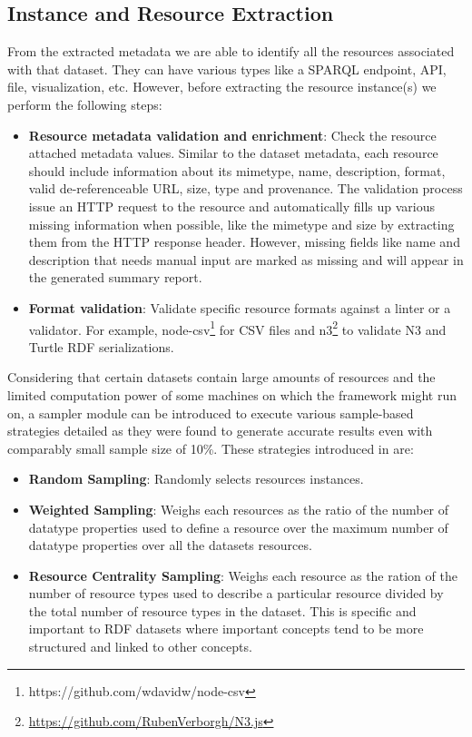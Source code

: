 \documentclass[runningheads,a4paper]{llncs}
\begin{document}
\subsection{Instance and Resource Extraction}
From the extracted metadata we are able to identify all the resources associated with that dataset. They can have various types like a SPARQL endpoint, API, file, visualization, etc. However, before extracting the resource instance(s) we perform the following steps:
\begin{itemize}
  \item \textbf{Resource metadata validation and enrichment}: Check the resource attached metadata values. Similar to the dataset metadata, each resource should include information about its mimetype, name, description, format, valid de-referenceable URL, size, type and provenance. The validation process issue an HTTP request to the resource and automatically fills up various missing information when possible, like the mimetype and size by extracting them from the HTTP response header. However, missing fields like name and description that needs manual input are marked as missing and will appear in the generated summary report.
  \item \textbf{Format validation}: Validate specific resource formats against a linter or a validator. For example, node-csv\footnote{https://github.com/wdavidw/node-csv} for CSV files and n3\footnote{\url{https://github.com/RubenVerborgh/N3.js}} to validate N3 and Turtle RDF serializations.
\end{itemize}

Considering that certain datasets contain large amounts of resources and the limited computation power of some machines on which the framework might run on, a sampler module can be introduced to execute various sample-based strategies detailed as they were found to generate accurate results even with comparably small sample size of 10\%. These strategies introduced in \cite{scalableApproach} are:
\begin{itemize}
  \item \textbf{Random Sampling}: Randomly selects resources instances.
  \item \textbf{Weighted Sampling}: Weighs each resources as the ratio of the number of datatype properties used to define a resource over the maximum number of datatype properties over all the datasets resources.
  \item \textbf{Resource Centrality Sampling}: Weighs each resource as the ration of the number of resource types used to describe a particular resource divided by the total number of resource types in the dataset. This is specific and important to RDF datasets where important concepts tend to be more structured and linked to other concepts.
\end{itemize}
\end{document}
